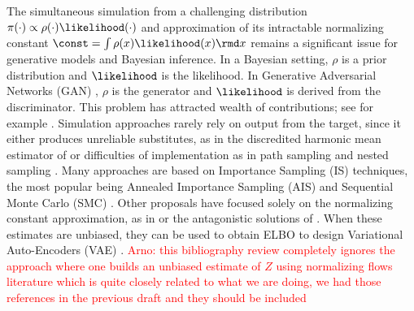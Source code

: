 The simultaneous simulation from a challenging distribution $\pi(\cdot)\propto\rho(\cdot)\likelihood(\cdot)$ and approximation of its intractable normalizing constant $\const=\int \rho(x) \likelihood(x) \rmd x$ remains a significant issue for generative models and Bayesian inference. In a Bayesian setting, $\rho$ is a prior distribution and $\likelihood$ is the likelihood. In Generative Adversarial Networks (GAN) \cite{turner:hung:2019, che:bengio:2020}, $\rho$ is the generator and $\likelihood$ is derived from the discriminator.
This problem has attracted wealth of  contributions; see for example \citep{chenetal00}. Simulation approaches rarely rely on output from the target, since 
it either produces unreliable substitutes, as in the discredited harmonic mean estimator of \cite{newton:raftery:1994} or difficulties of implementation as in path sampling \citep{gelman1998simulating} and nested sampling \citep{skilling2006nested,chopin:robert:2010}. Many approaches are based on Importance Sampling (IS) techniques, the most popular being Annealed Importance Sampling (AIS) \citep{neal:2001, wu:burda:grosse:2016,ding2019learning} and Sequential Monte Carlo (SMC) \citep{del2006sequential}.
Other proposals have focused solely on the normalizing constant approximation, as in \cite{chib:1995} or the antagonistic solutions of \cite{geyer:1993,gutmann:hyvarinen:2012}. When these estimates are unbiased, they can be used to obtain ELBO to design Variational Auto-Encoders (VAE) \citep{mnih2016variational}.
\textcolor{red}{Arno: this bibliography review completely ignores the approach where one builds an unbiased estimate of $Z$ using normalizing flows literature which is quite closely related to what we are doing, we had those references in the previous draft and they should be included}


